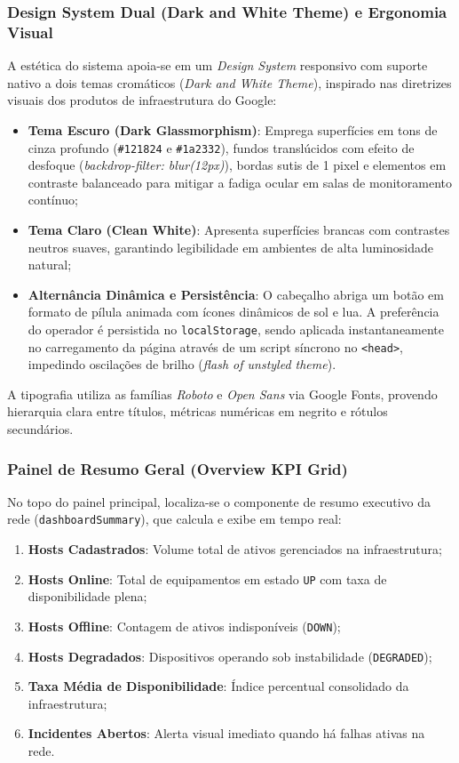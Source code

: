 \documentclass[12pt,a4paper]{article}
\begin{document}
\subsubsection{Design System Dual (Dark and White Theme) e Ergonomia Visual}
A estética do sistema apoia-se em um \textit{Design System} responsivo com suporte nativo a dois temas cromáticos (\textit{Dark and White Theme}), inspirado nas diretrizes visuais dos produtos de infraestrutura do Google:
\begin{itemize}[leftmargin=1.25cm]
\item \textbf{Tema Escuro (Dark Glassmorphism)}: Emprega superfícies em tons de cinza profundo (\texttt{\#121824} e \texttt{\#1a2332}), fundos translúcidos com efeito de desfoque (\textit{backdrop-filter: blur(12px)}), bordas sutis de 1 pixel e elementos em contraste balanceado para mitigar a fadiga ocular em salas de monitoramento contínuo;
\item \textbf{Tema Claro (Clean White)}: Apresenta superfícies brancas com contrastes neutros suaves, garantindo legibilidade em ambientes de alta luminosidade natural;
\item \textbf{Alternância Dinâmica e Persistência}: O cabeçalho abriga um botão em formato de pílula animada com ícones dinâmicos de sol e lua. A preferência do operador é persistida no \texttt{localStorage}, sendo aplicada instantaneamente no carregamento da página através de um script síncrono no \texttt{<head>}, impedindo oscilações de brilho (\textit{flash of unstyled theme}).
\end{itemize}

A tipografia utiliza as famílias \textit{Roboto} e \textit{Open Sans} via Google Fonts, provendo hierarquia clara entre títulos, métricas numéricas em negrito e rótulos secundários.

\subsubsection{Painel de Resumo Geral (Overview KPI Grid)}
No topo do painel principal, localiza-se o componente de resumo executivo da rede (\texttt{dashboardSummary}), que calcula e exibe em tempo real:
\begin{enumerate}[leftmargin=1.25cm]
\item \textbf{Hosts Cadastrados}: Volume total de ativos gerenciados na infraestrutura;
\item \textbf{Hosts Online}: Total de equipamentos em estado \texttt{UP} com taxa de disponibilidade plena;
\item \textbf{Hosts Offline}: Contagem de ativos indisponíveis (\texttt{DOWN});
\item \textbf{Hosts Degradados}: Dispositivos operando sob instabilidade (\texttt{DEGRADED});
\item \textbf{Taxa Média de Disponibilidade}: Índice percentual consolidado da infraestrutura;
\item \textbf{Incidentes Abertos}: Alerta visual imediato quando há falhas ativas na rede.
\end{enumerate}
\end{document}

